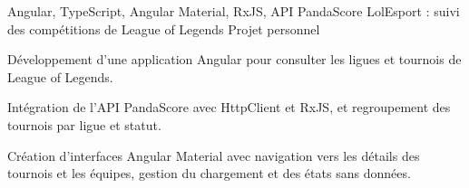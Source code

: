 
\begin{cventries}
  \cventry
    {Angular, TypeScript, Angular Material, RxJS, API PandaScore}
    {LolEsport : suivi des compétitions de League of Legends}
    {Projet personnel}
    {}
    {
      \begin{cvitems}
        \item {Développement d’une application Angular pour consulter les ligues et tournois de League of Legends.}
        \item {Intégration de l’API PandaScore avec HttpClient et RxJS, et regroupement des tournois par ligue et statut.}
        \item {Création d’interfaces Angular Material avec navigation vers les détails des tournois et les équipes, gestion du chargement et des états sans données.}
      \end{cvitems}
    }
\end{cventries}

